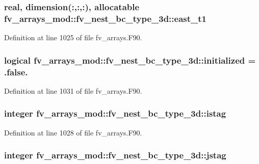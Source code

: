 \subsubsection[{east\-\_\-t1}]{\setlength{\rightskip}{0pt plus 5cm}real, dimension(\-:,\-:,\-:), allocatable fv\-\_\-arrays\-\_\-mod\-::fv\-\_\-nest\-\_\-bc\-\_\-type\-\_\-3d\-::east\-\_\-t1}\label{structfv__arrays__mod_1_1fv__nest__bc__type__3d_a81e5130c31341a6d82c2b99e4c5954a3}


Definition at line 1025 of file fv\-\_\-arrays.\-F90.

\subsubsection[{initialized}]{\setlength{\rightskip}{0pt plus 5cm}logical fv\-\_\-arrays\-\_\-mod\-::fv\-\_\-nest\-\_\-bc\-\_\-type\-\_\-3d\-::initialized = .false.}\label{structfv__arrays__mod_1_1fv__nest__bc__type__3d_ae0e0c42c38974311cb089dc36b4e3eb5}


Definition at line 1031 of file fv\-\_\-arrays.\-F90.

\subsubsection[{istag}]{\setlength{\rightskip}{0pt plus 5cm}integer fv\-\_\-arrays\-\_\-mod\-::fv\-\_\-nest\-\_\-bc\-\_\-type\-\_\-3d\-::istag}\label{structfv__arrays__mod_1_1fv__nest__bc__type__3d_a3a61790b97caa2c43e41e654f9e31d5c}


Definition at line 1028 of file fv\-\_\-arrays.\-F90.

\subsubsection[{jstag}]{\setlength{\rightskip}{0pt plus 5cm}integer fv\-\_\-arrays\-\_\-mod\-::fv\-\_\-nest\-\_\-bc\-\_\-type\-\_\-3d\-::jstag}\label{structfv__arrays__mod_1_1fv__nest__bc__type__3d_aeab6fc04407b6482a2fe68781db30221}


